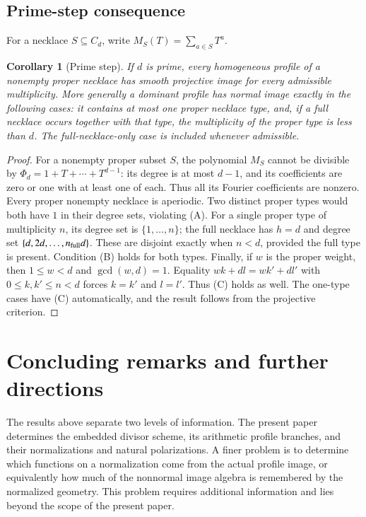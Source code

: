 \documentclass[10pt,fleqn]{article}
\numberwithin{equation}{section}
\newtheorem{corollary}[theorem]{Corollary}
\begin{document}
\subsection{Prime-step consequence}
For a necklace $S\subseteq C_d$, write $M_S(T)=\sum_{a\in S}T^a$.
\begin{corollary}[Prime step]
\label{v6:norm:prime-step}
If $d$ is prime, every homogeneous profile of a nonempty proper
necklace has smooth projective image for every admissible
multiplicity.  More generally a dominant profile has normal image
exactly in the following cases: it contains at most one proper
necklace type, and, if a full necklace occurs together with that
type, the multiplicity of the proper type is less than $d$.
The full-necklace-only case is included whenever admissible.
\end{corollary}

\begin{proof}
For a nonempty proper subset $S$, the polynomial $M_S$ cannot be
divisible by $\Phi_d=1+T+\cdots+T^{d-1}$: its degree is at most
$d-1$, and its coefficients are zero or one with at least one of
each.  Thus all its Fourier coefficients are nonzero.  Every
proper nonempty necklace is aperiodic.  Two distinct proper types
would both have $1$ in their degree sets, violating (A).  For a
single proper type of multiplicity $n$, its degree set is
$\{1,\ldots,n\}$; the full necklace has $h=d$ and degree set
$\{d,2d,\ldots,n_{\rm full}d\}$.  These are disjoint exactly when
$n<d$, provided the full type is present.  Condition (B) holds for
both types.  Finally, if $w$ is the proper weight, then
$1\le w<d$ and $\gcd(w,d)=1$.  Equality
$wk+dl=wk'+dl'$ with $0\le k,k'\le n<d$ forces $k=k'$ and
$l=l'$.  Thus (C) holds as well.  The one-type cases have (C)
automatically, and the result follows from the projective
criterion.
\end{proof}

\section{Concluding remarks and further directions}\label{sec:conclusion-new}
The results above separate two levels of information.  The present paper
determines the embedded divisor scheme, its arithmetic profile branches, and
their normalizations and natural polarizations.  A finer problem is to
determine which functions on a normalization come from the actual profile
image, or equivalently how much of the nonnormal image algebra is remembered
by the normalized geometry.  This problem requires additional information
and lies beyond the scope of the present paper.
\end{document}
